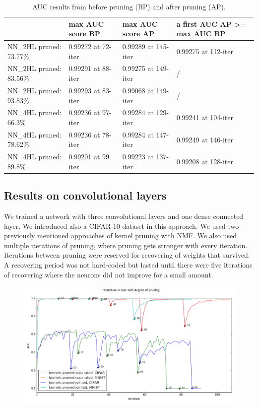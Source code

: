 \documentclass{article} %
\begin{document}
\begin{table}[!ht]
\centering
\begin{tabular}{l|l|l|p{3cm}|}
\cline{2-4}
 & max AUC score BP & max AUC score AP & a first AUC AP \textgreater= max AUC BP 
\\ \hline
\multicolumn{1}{|l|}{NN\_2HL pruned: 73.77\%} & 0.99272 at 72-iter & 0.99289 at 
145-iter & 0.99275 at 112-iter \\ \hline
\multicolumn{1}{|l|}{NN\_2HL pruned: 83.56\%} & 0.99291 at 88-iter & 0.99275 at 
149-iter & / \\ \hline
\multicolumn{1}{|l|}{NN\_2HL pruned: 93.83\%} & 0.99293 at 83-iter & 0.99068 at 
149-iter & / \\ \hline
\multicolumn{1}{|l|}{NN\_4HL pruned: 66.3\%} & 0.99236 at 97-iter & 0.99284 at 
129-iter & 0.99241 at 104-iter \\ \hline
\multicolumn{1}{|l|}{NN\_4HL pruned: 78.62\%} & 0.99236 at 78-iter & 0.99284 at 
147-iter & 0.99249 at 146-iter \\ \hline
\multicolumn{1}{|l|}{NN\_4HL pruned: 89.8\%} & 0.99201 at 99 iter & 0.99223 at 
137-iter & 0.99208 at 128-iter \\ \hline
\end{tabular}
\caption{AUC results from before pruning (BP) and after pruning (AP).}
\label{t:results}
\end{table}

\subsection{Results on convolutional layers}
We trained a network with three convolutional layers and one dense connected 
layer. We introduced also a CIFAR-10 dataset in this approach. We used two 
previously mentioned approaches of kernel pruning with NMF. We also used 
multiple iterations of pruning, where pruning gets stronger with every 
iteration. Iterations between pruning were reserved for recovering of weights 
that survived. A recovering period was not hard-coded but lasted until there 
were five iterations of recovering where the neurons did not improve for a small 
amount.  

\begin{figure}[!ht]
\centering
\includegraphics[width=1\linewidth]{convresults.png}
\label{f:results_conv}
\end{figure}
\end{document}
